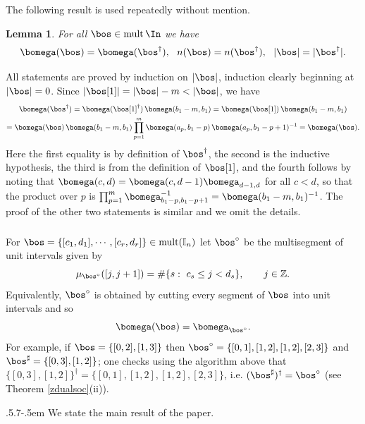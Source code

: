 \documentclass[11pt,reqno]{amsart}
\makeatletter
\newtheorem*{lem}{Lemma}
\theoremstyle{definition} \newtheorem*{defn}{Definition}
\theoremstyle{definition}
\newenvironment{pf}{\proof}{\endproof}
\numberwithin{equation}{section}
\def\subsection{\def\@secnumfont{\bfseries}\@startsection{subsection}{2}%
  {\parindent}{.5\linespacing\@plus.7\linespacing}{-.5em}%
  {\normalfont\bfseries}}
\def\mult{\operatorname{mult}}
\makeatother
\begin{document}
\subsubsection{}
The following result is used repeatedly without mention.
\begin{lem}\label{daggerinv}
    For all $\bos\in\mult\In$ we have $$\bomega(\bos)=\bomega(\bos^\dagger),\ \ n(\bos)=n(\bos^\dagger),\ \ |\bos|=|\bos^\dagger|.$$
\end{lem}
\begin{pf} All statements are proved  by
induction on $|\bos|$, induction clearly beginning at $|\bos|=0$. Since
$|\bos[1]|=|\bos|-m<|\bos|$, we have
\begin{gather*}\bomega(\bos^\dagger)=\bomega(\bos[1]^\dagger)\,\bomega(b_1-m,b_1)=\bomega(\bos[1])\,\bomega(b_1-m,b_1)\\
=\bomega(\bos)\,\bomega(b_1-m,b_1)\prod_{p=1}^m\bomega(a_p,b_1-p)\,\bomega(a_p,b_1-p+1)^{-1}=\bomega(\bos).
\end{gather*}
Here the first equality is by definition of $\bos^\dagger$, the second is the inductive hypothesis, the third is
from the definition of $\bos[1]$, and the fourth follows by noting that $\bomega(c,d)=\bomega(c,d-1)\bomega_{d-1,d}$
for all $c<d$, so that the product over $p$ is $\prod_{p=1}^m\bomega_{b_1-p,b_1-p+1}^{-1}=\bomega(b_1-m,b_1)^{-1}$.  The proof of the other two statements is similar and we omit the details.
\end{pf}
\subsubsection{} For $\bos=\{[c_1,d_1],\cdots,[c_r,d_r]\}\in{\rm mult}(\mathbb I_n)$ let $\bos^\circ$ be the multisegment
of unit intervals given by
$$\mu_{\bos^\circ}([j,j+1])=\#\{s:\ c_s\le j<d_s\},\qquad j\in\mathbb Z.$$
Equivalently, $\bos^\circ$ is obtained by cutting every segment of $\bos$ into unit intervals and so
$$\bomega(\bos)=\bomega_{\bos^\circ}.$$ 
 For example, if $\bos=\{[0,2],[1,3]\}$ then $\bos^\circ=\{[0,1],[1,2],[1,2],[2,3]\}$ and $\bos^\sharp=\{[0,3],[1,2]\}$;
 one checks using the algorithm above that $\{[0,3],[1,2]\}^\dagger=\{[0,1],[1,2],[1,2],[2,3]\}$, i.e.
 $(\bos^\sharp)^\dagger=\bos^\circ$ (see Theorem \ref{zdualsoc}(ii)).
 
\subsection{} We state the main result of the paper.
\end{document}
